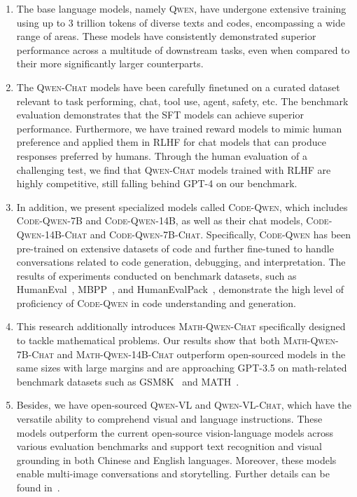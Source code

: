 \begin{enumerate}
\item The base language models, namely \textsc{Qwen}, have undergone extensive training using up to \num{3} trillion tokens of diverse texts and codes, encompassing a wide range of areas. These models have consistently demonstrated superior performance across a multitude of downstream tasks, even when compared to their more significantly larger counterparts.

\item 
The \textsc{Qwen-Chat} models have been carefully finetuned on a curated dataset relevant to task performing, chat, tool use, agent, safety, etc. The benchmark evaluation demonstrates that the SFT models can achieve superior performance. Furthermore, we have trained reward models to mimic human preference and applied them in RLHF for chat models that can produce responses preferred by humans. Through the human evaluation of a challenging test, we find that \textsc{Qwen-Chat} models trained with RLHF are highly competitive, still falling behind GPT-4 on our benchmark. 

\item In addition, we present specialized models called \textsc{Code-Qwen}, which includes \textsc{Code-Qwen-7B} and \textsc{Code-Qwen-14B}, as well as their chat models, \textsc{Code-Qwen-14B-Chat} and \textsc{Code-Qwen-7B-Chat}. Specifically, \textsc{Code-Qwen} has been pre-trained on extensive datasets of code and further fine-tuned to handle conversations related to code generation, debugging, and interpretation. The results of experiments conducted on benchmark datasets, such as HumanEval~\citep{codex}, MBPP~\citep{mbpp}, and HumanEvalPack~\citep{octopack}, demonstrate the high level of proficiency of \textsc{Code-Qwen} in code understanding and generation. 

\item This research additionally introduces \textsc{Math-Qwen-Chat} specifically designed to tackle mathematical problems. Our results show that both \textsc{Math-Qwen-7B-Chat} and \textsc{Math-Qwen-14B-Chat} outperform open-sourced models in the same sizes with large margins and are approaching GPT-3.5 on math-related benchmark datasets such as GSM8K~\citep{gsm8k} and MATH~\citep{hendrycks2021measuring}.

\item Besides, we have open-sourced \textsc{Qwen-VL} and \textsc{Qwen-VL-Chat}, which have the versatile ability to comprehend visual and language instructions. These models outperform the current open-source vision-language models across various evaluation benchmarks and support text recognition and visual grounding in both Chinese and English languages. Moreover, these models enable multi-image conversations and storytelling. Further details can be found in~\citet{qwenvl}.
\end{enumerate}

